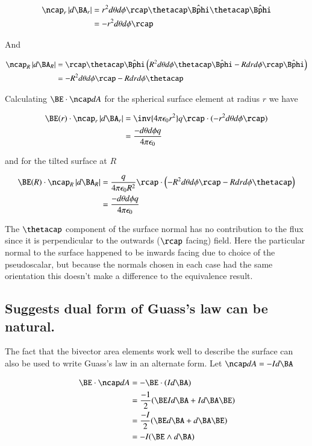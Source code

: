\documentclass{article}
\newcommand{\phicap}[0]{\hat{\Bphi}}
\begin{document}
\begin{align*}
\ncap_r \Abs{d\BA_r}
&= r^2 d\theta d\phi \rcap \thetacap \phicap \thetacap\phicap \\
&= -r^2 d\theta d\phi \rcap \\
\end{align*}

And

\begin{align*}
\ncap_R \Abs{d\BA_R}
&= \rcap \thetacap \phicap \left( R^2 d\theta d\phi \thetacap \phicap - R dr d\phi \rcap \phicap \right) \\
&= - R^2 d\theta d\phi \rcap - R dr d\phi \thetacap
\end{align*}

Calculating $\BE \cdot \ncap dA$ for the spherical surface element at radius $r$ we have

\begin{align*}
\BE(r) \cdot \ncap_r \Abs{d\BA_r}
&= \inv{4 \pi \epsilon_0 r^2} q \rcap \cdot (-r^2 d\theta d\phi \rcap) \\
&= \frac{-d\theta d\phi q}{4 \pi \epsilon_0}
\end{align*}

and for the tilted surface at $R$ 

\begin{align*}
\BE(R) \cdot \ncap_R \Abs{d\BA_R}
&= \frac{q}{4 \pi \epsilon_0 R^2} \rcap \cdot \left(- R^2 d\theta d\phi \rcap - R dr d\phi \thetacap \right) \\
&= \frac{-d\theta d\phi q}{4 \pi \epsilon_0}
\end{align*}

The $\thetacap$ component of the surface normal has no contribution to the flux since it is perpendicular to the outwards ($\rcap$ facing) field.  Here the particular normal to the surface happened to be inwards facing due to choice of the pseudoscalar, but because the normals chosen in each case had the same orientation this doesn't make a difference to the equivalence result.

\subsection{ Suggests dual form of Guass's law can be natural. }

The fact that the bivector area elements work well to describe the surface
can also be used to write Guass's law in an alternate form.  Let $\ncap dA = -I d\BA$

\begin{align*}
\BE \cdot \ncap dA
&= -\BE \cdot (I d\BA) \\
&= \frac{-1}{2} ( \BE I d\BA + I d\BA \BE ) \\
&= \frac{-I}{2} ( \BE d\BA + d\BA \BE ) \\
&= -I ( \BE \wedge d\BA )
\end{align*}
\end{document}
